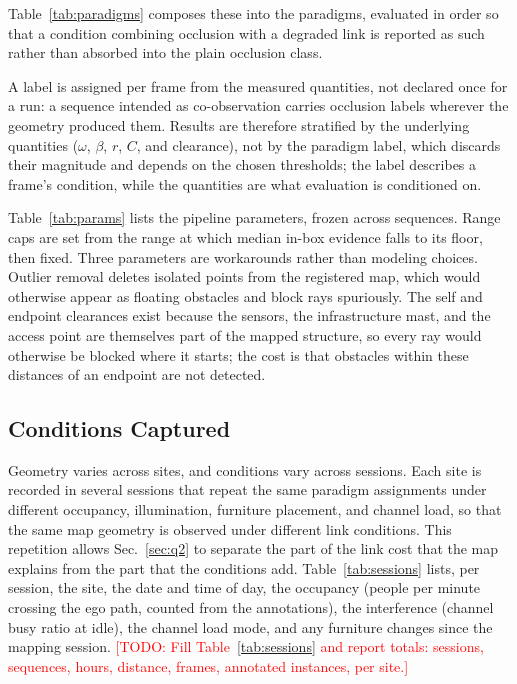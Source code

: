 \documentclass[journal]{IEEEtran}
\newcommand{\todo}[1]{\textcolor{red}{[TODO: #1]}}
\begin{document}


Table~\ref{tab:paradigms} composes these into the paradigms, evaluated
in order so that a condition combining occlusion with a degraded link
is reported as such rather than absorbed into the plain occlusion
class.



A label is assigned per frame from the measured quantities, not
declared once for a run: a sequence intended as co-observation carries
occlusion labels wherever the geometry produced them. Results are
therefore stratified by the underlying quantities ($\omega$, $\beta$,
$r$, $C$, and clearance), not by the paradigm label, which discards
their magnitude and depends on the chosen thresholds; the label
describes a frame's condition, while the quantities are what
evaluation is conditioned on.



Table~\ref{tab:params} lists the pipeline parameters, frozen across
sequences. Range caps are set from the range at which median in-box
evidence falls to its floor, then fixed. Three parameters are
workarounds rather than modeling choices. Outlier removal deletes
isolated points from the registered map, which would otherwise appear
as floating obstacles and block rays spuriously. The self and
endpoint clearances exist because the sensors, the infrastructure
mast, and the access point are themselves part of the mapped
structure, so every ray would otherwise be blocked where it starts;
the cost is that obstacles within these distances of an endpoint are
not detected.

\subsection{Conditions Captured}
\label{sec:conditions}
Geometry varies across sites, and conditions vary across sessions.
Each site is recorded in several sessions that repeat the same
paradigm assignments under different occupancy, illumination,
furniture placement, and channel load, so that the same map geometry
is observed under different link conditions. This repetition allows
Sec.~\ref{sec:q2} to separate the part of the link cost that the map
explains from the part that the conditions add.
Table~\ref{tab:sessions} lists, per session, the site, the date and
time of day, the occupancy (people per minute crossing the ego path,
counted from the annotations), the interference (channel busy ratio
at idle), the channel load mode, and any furniture changes since the
mapping session. \todo{Fill Table~\ref{tab:sessions} and report
totals: sessions, sequences, hours, distance, frames, annotated
instances, per site.}
\end{document}
